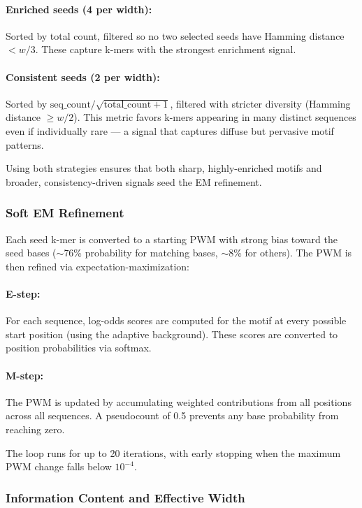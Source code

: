 \documentclass[11pt,a4paper]{article}
\begin{document}
\paragraph{Enriched seeds (4 per width):} Sorted by total count, filtered so no two selected seeds have Hamming distance $< w/3$. These capture k-mers with the strongest enrichment signal.

\paragraph{Consistent seeds (2 per width):} Sorted by $\text{seq\_count} / \sqrt{\text{total\_count} + 1}$, filtered with stricter diversity (Hamming distance $\geq w/2$). This metric favors k-mers appearing in many distinct sequences even if individually rare --- a signal that captures diffuse but pervasive motif patterns.

Using both strategies ensures that both sharp, highly-enriched motifs and broader, consistency-driven signals seed the EM refinement.

\subsubsection{Soft EM Refinement}

Each seed k-mer is converted to a starting PWM with strong bias toward the seed bases ($\sim$76\% probability for matching bases, $\sim$8\% for others). The PWM is then refined via expectation-maximization:

\paragraph{E-step:} For each sequence, log-odds scores are computed for the motif at every possible start position (using the adaptive background). These scores are converted to position probabilities via softmax.

\paragraph{M-step:} The PWM is updated by accumulating weighted contributions from all positions across all sequences. A pseudocount of 0.5 prevents any base probability from reaching zero.

The loop runs for up to 20 iterations, with early stopping when the maximum PWM change falls below $10^{-4}$.

\subsubsection{Information Content and Effective Width}
\end{document}
